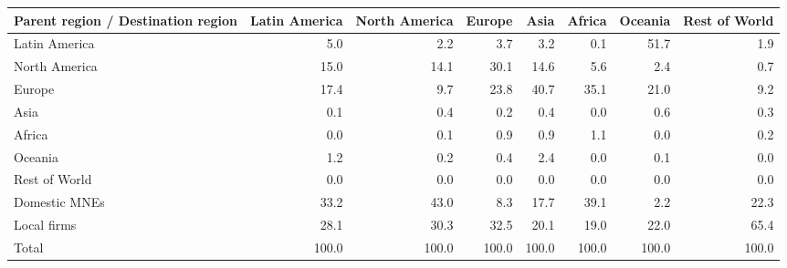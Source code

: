 \begin{tabular}{lrrrrrrr}
\toprule
Parent region / Destination region & Latin America & North America & Europe & Asia & Africa & Oceania & Rest of World \\
\midrule
Latin America & 5.0 & 2.2 & 3.7 & 3.2 & 0.1 & 51.7 & 1.9 \\
North America & 15.0 & 14.1 & 30.1 & 14.6 & 5.6 & 2.4 & 0.7 \\
Europe & 17.4 & 9.7 & 23.8 & 40.7 & 35.1 & 21.0 & 9.2 \\
Asia & 0.1 & 0.4 & 0.2 & 0.4 & 0.0 & 0.6 & 0.3 \\
Africa & 0.0 & 0.1 & 0.9 & 0.9 & 1.1 & 0.0 & 0.2 \\
Oceania & 1.2 & 0.2 & 0.4 & 2.4 & 0.0 & 0.1 & 0.0 \\
Rest of World & 0.0 & 0.0 & 0.0 & 0.0 & 0.0 & 0.0 & 0.0 \\
Domestic MNEs & 33.2 & 43.0 & 8.3 & 17.7 & 39.1 & 2.2 & 22.3 \\
Local firms & 28.1 & 30.3 & 32.5 & 20.1 & 19.0 & 22.0 & 65.4 \\
\midrule
Total & 100.0 & 100.0 & 100.0 & 100.0 & 100.0 & 100.0 & 100.0 \\
\bottomrule
\end{tabular}
